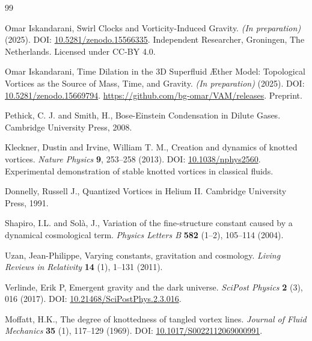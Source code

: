 \documentclass[12pt]{article}
\begin{document}
\begin{thebibliography}{99}

Omar Iskandarani,
\newblock Swirl Clocks and Vorticity-Induced Gravity.
\textit{(In preparation)} (2025).
\newblock DOI: \href{https://doi.org/10.5281/zenodo.15566335}{10.5281/zenodo.15566335}.
\newblock Independent Researcher, Groningen, The Netherlands. Licensed under CC-BY 4.0.


Omar Iskandarani,
\newblock Time Dilation in the 3D Superfluid Æther Model: Topological Vortices as the Source of Mass, Time, and Gravity.
\textit{(In preparation)} (2025).
\newblock DOI: \href{https://doi.org/10.5281/zenodo.15669794}{10.5281/zenodo.15669794}.
\newblock \url{https://github.com/bg-omar/VAM/releases}.
\newblock Preprint.


Pethick, C. J. and Smith, H.,
\newblock Bose-Einstein Condensation in Dilute Gases.
\newblock Cambridge University Press, 2008.


Kleckner, Dustin and Irvine, William T. M.,
\newblock Creation and dynamics of knotted vortices.
\textit{Nature Physics} \textbf{9}, 253--258 (2013).
\newblock DOI: \href{https://doi.org/10.1038/nphys2560}{10.1038/nphys2560}.
\newblock Experimental demonstration of stable knotted vortices in classical fluids.


Donnelly, Russell J.,
\newblock Quantized Vortices in Helium II.
\newblock Cambridge University Press, 1991.


Shapiro, I.L. and Sol\`a, J.,
\newblock Variation of the fine-structure constant caused by a dynamical cosmological term.
\textit{Physics Letters B} \textbf{582} (1--2), 105--114 (2004).


Uzan, Jean-Philippe,
\newblock Varying constants, gravitation and cosmology.
\textit{Living Reviews in Relativity} \textbf{14} (1), 1--131 (2011).


Verlinde, Erik P,
\newblock Emergent gravity and the dark universe.
\textit{SciPost Physics} \textbf{2} (3), 016 (2017).
\newblock DOI: \href{https://doi.org/10.21468/SciPostPhys.2.3.016}{10.21468/SciPostPhys.2.3.016}.


Moffatt, H.K.,
\newblock The degree of knottedness of tangled vortex lines.
\textit{Journal of Fluid Mechanics} \textbf{35} (1), 117--129 (1969).
\newblock DOI: \href{https://doi.org/10.1017/S0022112069000991}{10.1017/S0022112069000991}.



\end{thebibliography}
\end{document}

